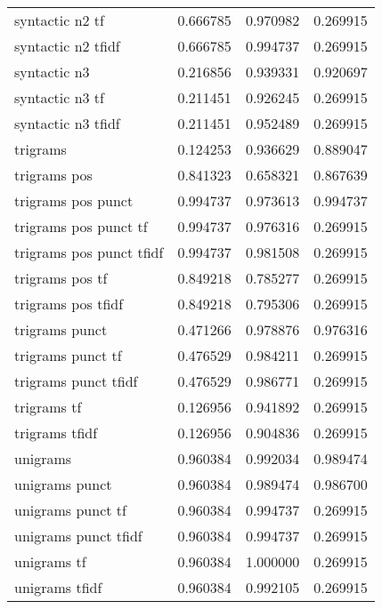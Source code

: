 \documentclass{article}
\begin{document}
\begin{table}
\begin{tabular}{lrrr}
syntactic n2 tf            &  0.666785 &       0.970982 &             0.269915 \\
syntactic n2 tfidf         &  0.666785 &       0.994737 &             0.269915 \\
syntactic n3               &  0.216856 &       0.939331 &             0.920697 \\
syntactic n3 tf            &  0.211451 &       0.926245 &             0.269915 \\
syntactic n3 tfidf         &  0.211451 &       0.952489 &             0.269915 \\
trigrams                   &  0.124253 &       0.936629 &             0.889047 \\
trigrams pos               &  0.841323 &       0.658321 &             0.867639 \\
trigrams pos punct         &  0.994737 &       0.973613 &             0.994737 \\
trigrams pos punct tf      &  0.994737 &       0.976316 &             0.269915 \\
trigrams pos punct tfidf   &  0.994737 &       0.981508 &             0.269915 \\
trigrams pos tf            &  0.849218 &       0.785277 &             0.269915 \\
trigrams pos tfidf         &  0.849218 &       0.795306 &             0.269915 \\
trigrams punct             &  0.471266 &       0.978876 &             0.976316 \\
trigrams punct tf          &  0.476529 &       0.984211 &             0.269915 \\
trigrams punct tfidf       &  0.476529 &       0.986771 &             0.269915 \\
trigrams tf                &  0.126956 &       0.941892 &             0.269915 \\
trigrams tfidf             &  0.126956 &       0.904836 &             0.269915 \\
unigrams                   &  0.960384 &       0.992034 &             0.989474 \\
unigrams punct             &  0.960384 &       0.989474 &             0.986700 \\
unigrams punct tf          &  0.960384 &       0.994737 &             0.269915 \\
unigrams punct tfidf       &  0.960384 &       0.994737 &             0.269915 \\
unigrams tf                &  0.960384 &       1.000000 &             0.269915 \\
unigrams tfidf             &  0.960384 &       0.992105 &             0.269915 \\
\bottomrule
\end{tabular}
\end{table}
\end{document}

